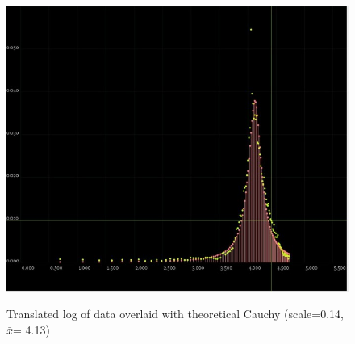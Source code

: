 \documentclass[10pt]{article}
\begin{document}
\begin{figure}
\caption{Translated log of data overlaid with theoretical Cauchy (scale=0.14, $\bar{x}$= 4.13)}
\label{ShapeOfTranslatedLogOffImprovementWrtCauchy}
\begin{center}
\includegraphics[width=120mm]{ReportMedia/ShapeOfTranslatedLogOffImprovementWrtCauchy.jpg}\\
\end{center}
\end{figure}
\end{document}

